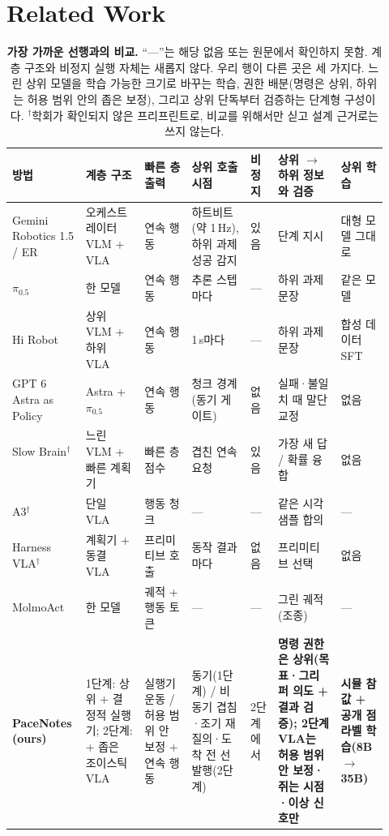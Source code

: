 \section{Related Work}
\label{sec:related}

\begin{table}[t]
\centering
\scriptsize
\setlength{\tabcolsep}{3pt}
\begin{tabular}{@{}p{0.15\linewidth}p{0.15\linewidth}p{0.12\linewidth}p{0.15\linewidth}p{0.07\linewidth}p{0.16\linewidth}p{0.12\linewidth}@{}}
\toprule
방법 & 계층 구조 & 빠른 층 출력 & 상위 호출 시점 & 비정지 & 상위 $\rightarrow$ 하위 정보와 검증 & 상위 학습 \\
\midrule
Gemini Robotics 1.5 / ER~\cite{geminirobotics15_2025,geminier_docs2026} & 오케스트레이터 VLM + VLA & 연속 행동 & 하트비트(약 1\,Hz), 하위 과제 성공 감지 & 있음 & 단계 지시 & 대형 모델 그대로 \\
$\pi_{0.5}$~\cite{pi05_2025} & 한 모델 & 연속 행동 & 추론 스텝마다 & --- & 하위 과제 문장 & 같은 모델 \\
Hi Robot~\cite{hirobot2025} & 상위 VLM + 하위 VLA & 연속 행동 & 1\,s마다 & --- & 하위 과제 문장 & 합성 데이터 SFT \\
GPT 6 Astra as Policy~\cite{su2026astra} & Astra + $\pi_{0.5}$ & 연속 행동 & 청크 경계(동기 게이트) & 없음 & 실패·불일치 때 말단 교정 & 없음 \\
Slow Brain$^\dagger$~\cite{slowbrain2026} & 느린 VLM + 빠른 계획기 & 빠른 층 점수 & 겹친 연속 요청 & 있음 & 가장 새 답 / 확률 융합 & 없음 \\
A3$^\dagger$~\cite{a3commit2026} & 단일 VLA & 행동 청크 & --- & --- & 같은 시각 샘플 합의 & --- \\
Harness VLA$^\dagger$~\cite{harnessvla2026} & 계획기 + 동결 VLA & 프리미티브 호출 & 동작 결과마다 & 없음 & 프리미티브 선택 & 없음 \\
MolmoAct~\cite{molmoact2026} & 한 모델 & 궤적 + 행동 토큰 & --- & --- & 그린 궤적(조종) & --- \\
\midrule
\textbf{PaceNotes (ours)} & 1단계: 상위 + 결정적 실행기; 2단계: + 좁은 조이스틱 VLA & 실행기 운동 / 허용 범위 안 보정 + 연속 행동 & 동기(1단계) / 비동기 겹침·조기 재질의·도착 전 선발행(2단계) & 2단계에서 & \textbf{명령 권한은 상위(목표·그리퍼 의도 + 결과 검증); 2단계 VLA는 허용 범위 안 보정·쥐는 시점·이상 신호만} & \textbf{시뮬 참값 + 공개 점 라벨 학습(8B $\rightarrow$ 35B)} \\
\bottomrule
\end{tabular}
\caption{\textbf{가장 가까운 선행과의 비교.} ``---''는 해당 없음 또는 원문에서 확인하지 못함. 계층 구조와 비정지 실행 자체는 새롭지 않다. 우리 행이 다른 곳은 세 가지다. 느린 상위 모델을 학습 가능한 크기로 바꾸는 학습, 권한 배분(명령은 상위, 하위는 허용 범위 안의 좁은 보정), 그리고 상위 단독부터 검증하는 단계형 구성이다. $^\dagger$학회가 확인되지 않은 프리프린트로, 비교를 위해서만 싣고 설계 근거로는 쓰지 않는다.}
\label{tab:related}
\end{table}

